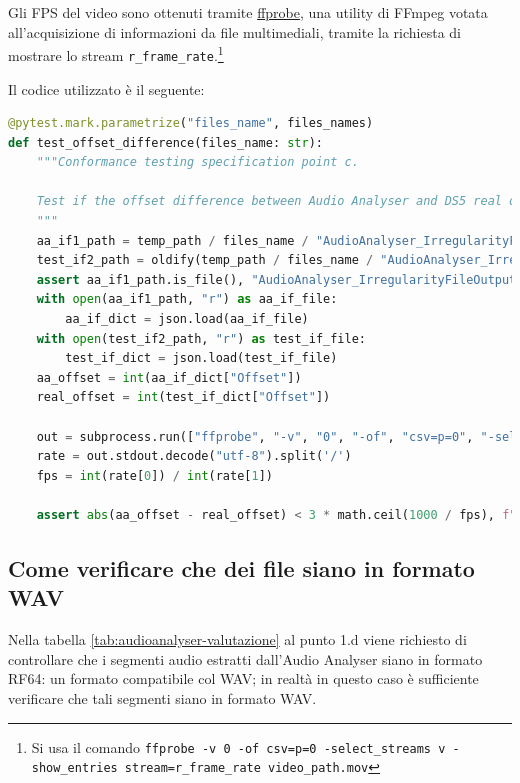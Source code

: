 Gli FPS del video sono ottenuti tramite \href{https://ffmpeg.org/ffprobe.html}{ffprobe}, una utility di FFmpeg votata all'acquisizione di informazioni da file multimediali, tramite la richiesta di mostrare lo stream \verb|r_frame_rate|.\footnote{Si usa il comando \texttt{ffprobe -v 0 -of csv=p=0 -select\_streams v -show\_entries stream=r\_frame\_rate video\_path.mov}}

Il codice utilizzato è il seguente:
\begin{lstlisting}[language=Python]
@pytest.mark.parametrize("files_name", files_names)
def test_offset_difference(files_name: str):
    """Conformance testing specification point c.

    Test if the offset difference between Audio Analyser and DS5 real offset is small.
    """
    aa_if1_path = temp_path / files_name / "AudioAnalyser_IrregularityFileOutput1.json"
    test_if2_path = oldify(temp_path / files_name / "AudioAnalyser_IrregularityFileOutput1.json")
    assert aa_if1_path.is_file(), "AudioAnalyser_IrregularityFileOutput1.json not found"
    with open(aa_if1_path, "r") as aa_if_file:
        aa_if_dict = json.load(aa_if_file)
    with open(test_if2_path, "r") as test_if_file:
        test_if_dict = json.load(test_if_file)
    aa_offset = int(aa_if_dict["Offset"])
    real_offset = int(test_if_dict["Offset"])

    out = subprocess.run(["ffprobe", "-v", "0", "-of", "csv=p=0", "-select_streams", "v", "-show_entries", "stream=r_frame_rate", str(working_path / "PreservationAudioVisualFile" / (files_name+".mov"))], capture_output=True)
    rate = out.stdout.decode("utf-8").split('/')
    fps = int(rate[0]) / int(rate[1])
    
    assert abs(aa_offset - real_offset) < 3 * math.ceil(1000 / fps), f"Offset difference is too big: {abs(aa_offset - real_offset)}ms"
\end{lstlisting}


\subsection{Come verificare che dei file siano in formato WAV} \label{ssec:audioanalyser-wav}    %
Nella tabella \ref{tab:audioanalyser-valutazione} al punto 1.d viene richiesto di controllare che i segmenti audio estratti dall'Audio Analyser siano in formato RF64: un formato compatibile col WAV; in realtà in questo caso è sufficiente verificare che tali segmenti siano in formato WAV.

